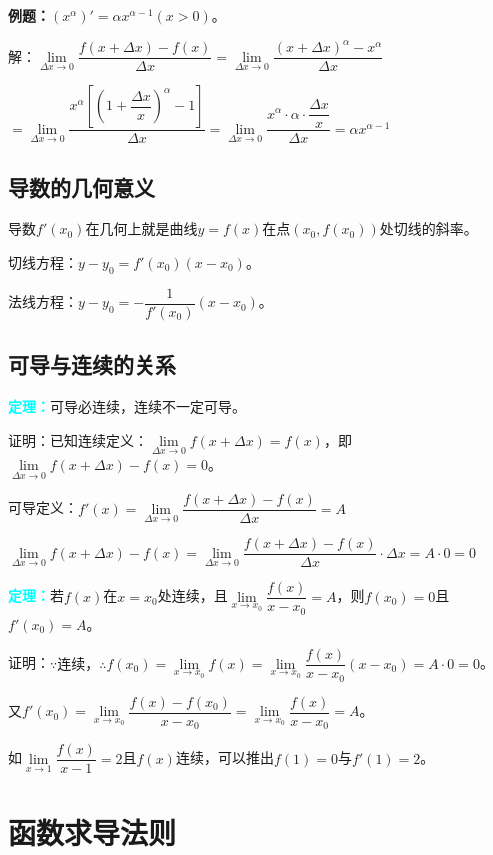 \documentclass[UTF8, 12pt]{ctexart}
\begin{document}
\textbf{例题：}$\left(x^\alpha\right)'=\alpha x^{\alpha-1}(x>0)$。\medskip

解：$\lim\limits_{\Delta x\to 0}\dfrac{f(x+\Delta x)-f(x)}{\Delta x}=\lim\limits_{\Delta x\to 0}\dfrac{\left(x+\Delta x\right)^\alpha-x^\alpha}{\Delta x}$\medskip

$=\lim\limits_{\Delta x\to 0}\dfrac{x^\alpha\left[\left(1+\dfrac{\Delta x}{x}\right)^\alpha-1\right]}{\Delta x}=\lim\limits_{\Delta x\to 0}\dfrac{x^\alpha\cdot\alpha\cdot\dfrac{\Delta x}{x}}{\Delta x}=\alpha x^{\alpha-1}$

\subsection{导数的几何意义}

导数$f'(x_0)$在几何上就是曲线$y=f(x)$在点$(x_0,f(x_0))$处切线的斜率。

切线方程：$y-y_0=f'(x_0)(x-x_0)$。

法线方程：$y-y_0=-\dfrac{1}{f'(x_0)}(x-x_0)$。

\subsection{可导与连续的关系}

\textcolor{aqua}{\textbf{定理：}}可导必连续，连续不一定可导。

证明：已知连续定义：$\lim\limits_{\Delta x\to 0}f(x+\Delta x)=f(x)$，即$\lim\limits_{\Delta x\to 0}f(x+\Delta x)-f(x)=0$。

可导定义：$f'(x)=\lim\limits_{\Delta x\to 0}\dfrac{f(x+\Delta x)-f(x)}{\Delta x} = A$

$\lim\limits_{\Delta x\to 0}f(x+\Delta x)-f(x)=\lim\limits_{\Delta x\to 0}\dfrac{f(x+\Delta x)-f(x)}{\Delta x}\cdot\Delta x=A\cdot 0=0$

\textcolor{aqua}{\textbf{定理：}}若$f(x)$在$x=x_0$处连续，且$\lim\limits_{x\to x_0}\dfrac{f(x)}{x-x_0}=A$，则$f(x_0)=0$且$f'(x_0)=A$。

证明：$\because\text{连续，}\therefore f(x_0)=\lim\limits_{x\to x_0}f(x)=\lim\limits_{x\to x_0}\dfrac{f(x)}{x-x_0}(x-x_0)=A\cdot 0=0$。

又$f'(x_0)=\lim\limits_{x\to x_0}\dfrac{f(x)-f(x_0)}{x-x_0}=\lim\limits_{x\to x_0}\dfrac{f(x)}{x-x_0}=A$。

如$\lim\limits_{x\to 1}\dfrac{f(x)}{x-1}=2$且$f(x)$连续，可以推出$f(1)=0$与$f'(1)=2$。

\section{函数求导法则}
\end{document}
